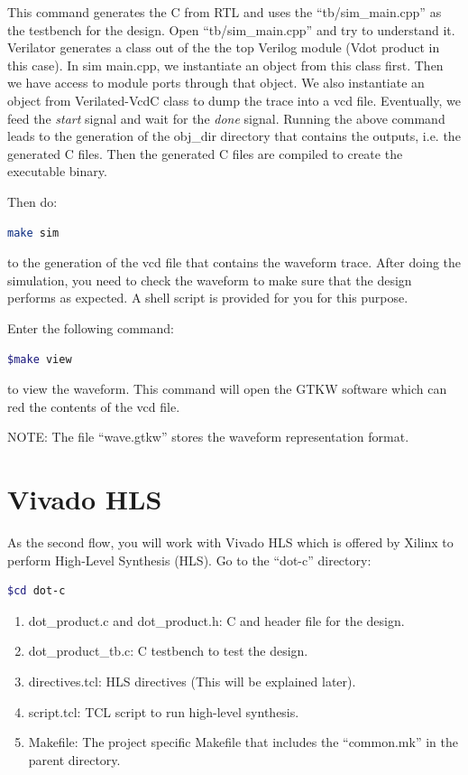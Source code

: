 \documentclass[12pt]{article}
\begin{document}
This command generates the C from RTL and uses the “tb/sim\_main.cpp”
as the testbench for the design. Open “tb/sim\_main.cpp” and try to
understand it. Verilator generates a class out of the the top Verilog
module (Vdot product in this case).  In sim main.cpp, we instantiate
an object from this class first. Then we have access to module ports
through that object. We also instantiate an object from Verilated-VcdC
class to dump the trace into a vcd file. Eventually, we feed the {\em
  start} signal and wait for the {\em done} signal. Running the above
command leads to the generation of the obj\_dir directory that
contains the outputs, i.e. the generated C files. Then the generated C
files are compiled to create the executable binary.

Then do:

\begin{lstlisting}[language=bash]
make sim
\end{lstlisting}

to the generation of the vcd file that contains the waveform trace.
After doing the simulation, you need to check the waveform to make
sure that the design performs as expected. A shell script is provided
for you for this purpose.

Enter the following command:

\begin{lstlisting}[language=bash]
  $make view
\end{lstlisting}

to view the waveform. This command will open the GTKW software which
can red the contents of the vcd file.

NOTE: The file “wave.gtkw” stores the waveform representation format.

\section{Vivado HLS}

As the second flow, you will work with Vivado HLS which is offered by
Xilinx to perform High-Level Synthesis (HLS). Go to the “dot-c”
directory:

\begin{lstlisting}[language=bash]
  $cd dot-c
\end{lstlisting}

\begin{enumerate}
\item dot\_product.c and dot\_product.h: C and header file for the design.

\item dot\_product\_tb.c: C testbench to test the design.

\item directives.tcl: HLS directives (This will be explained later).

\item script.tcl: TCL script to run high-level synthesis.

\item Makefile: The project specific Makefile that includes the “common.mk” in
  the parent directory.
  
\end{enumerate}
\end{document}
